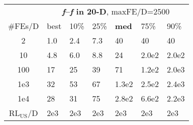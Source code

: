 \begin{tabular}{c|llllll}
 & \multicolumn{6}{|c}{\textbf{\textit{f}\raisebox{-0.35ex}{1}--\textit{f}\raisebox{-0.35ex}{24} in 20-D}, maxFE/D=2500}\\
\#FEs/D & best & 10\% & 25\% & \textbf{med} & 75\% & 90\%\\
2 & \hspace*{1ex}1.0 & \hspace*{1ex}2.4 & \hspace*{1ex}7.3 & 40 & 40 & 40\\
10 & \hspace*{1ex}4.8 & \hspace*{1ex}6.0 & \hspace*{1ex}8.8 & 24 & 2.0e2 & 2.0e2\\
100 & 17 & 25 & 39 & 71 & 1.2e2 & 2.0e3\\
1e3 & 32 & 53 & 67 & 1.3e2 & 2.5e2 & 2.4e3\\
1e4 & 28 & 31 & 75 & 2.8e2 & 6.6e2 & 2.2e3\\
$\text{RL}_{\text{US}}$/D & 2e3 & 2e3 & 2e3 & 2e3 & 2e3 & 2e3
\end{tabular}
